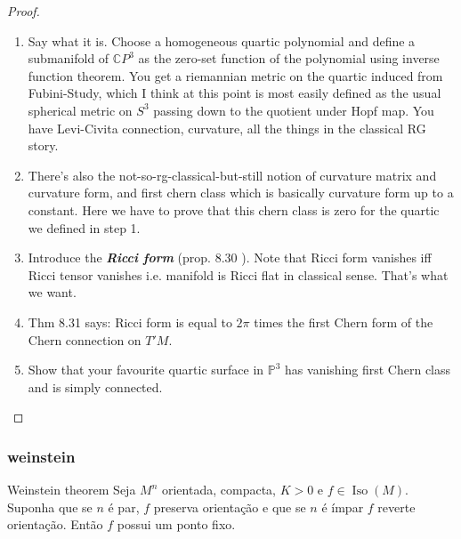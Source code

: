 \begin{proof}
\begin{enumerate}[label=\textbf{Step \arabic*}]
\item Say what it is. Choose a homogeneous quartic polynomial and define a submanifold of \(\mathbb{C}P^{3}\) as the zero-set function of the polynomial using inverse function theorem. You get a riemannian metric on the quartic induced from Fubini-Study, which I think at this point is most easily defined as the usual spherical metric on \(S^3\) passing down to the quotient under Hopf map. You have Levi-Civita connection, curvature, all the things in the classical RG story.
\item There's also the not-so-rg-classical-but-still notion of curvature matrix and curvature form, and first chern class which is basically curvature form up to a constant. Here we have to prove that this chern class is zero for the quartic we defined in step 1.
\item Introduce the \textit{\textbf{Ricci form}} (prop. 8.30 \cite{lec}). Note that Ricci form vanishes iff Ricci tensor vanishes i.e. manifold is Ricci flat in classical sense. That's what we want.
\item Thm 8.31 \cite{lec} says: Ricci form is equal to \(2\pi\) times the first Chern form of the Chern connection on \(T'M\).
\item Show that your favourite quartic surface in \(\mathbb{P}^3\) has vanishing first Chern class and is simply connected.
\end{enumerate}
\end{proof}

\subsubsection{weinstein}

\begin{thing6}{Weinstein theorem}\label{thm:Weinstein theorem}\leavevmode
Seja \(M^n\) orientada, compacta, \(K>0\) e \(f \in \operatorname{Iso}(M)\).  Suponha que se \(n\) é par, \(f\) preserva orientação e que se \(n\) é ímpar \(f\) reverte orientação. Então \(f\) possui um ponto fixo.
\end{thing6}


